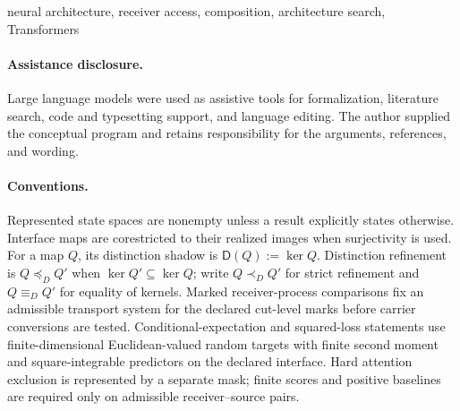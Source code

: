 \begin{keywords}
neural architecture, receiver access, composition, architecture search, Transformers
\end{keywords}

\paragraph{Assistance disclosure.}
Large language models were used as assistive tools for formalization, literature search, code and typesetting support, and language editing. The author supplied the conceptual program and retains responsibility for the arguments, references, and wording.

\paragraph{Conventions.}
Represented state spaces are nonempty unless a result explicitly states otherwise. Interface maps are corestricted to their realized images when surjectivity is used. For a map $Q$, its distinction shadow is $\mathsf D(Q):=\ker Q$. Distinction refinement is $Q\preceq_D Q'$ when $\ker Q'\subseteq\ker Q$; write $Q\prec_D Q'$ for strict refinement and $Q\equiv_D Q'$ for equality of kernels. Marked receiver-process comparisons fix an admissible transport system for the declared cut-level marks before carrier conversions are tested. Conditional-expectation and squared-loss statements use finite-dimensional Euclidean-valued random targets with finite second moment and square-integrable predictors on the declared interface. Hard attention exclusion is represented by a separate mask; finite scores and positive baselines are required only on admissible receiver--source pairs.















